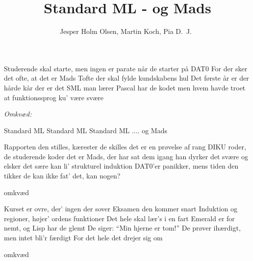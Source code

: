 \documentclass[11pt,a4paper]{article}
\title{Standard ML - og Mads}
\author{Jesper Holm Olsen, Martin Koch, Pia D.\ J.\ }
\begin{document}
\maketitle
\begin{song}
Studerende skal starte, men ingen er parate
når de starter på DAT0
For der sker det ofte, at det er Mads Tofte
der skal fylde kundskabens hul
Det første år er der hårde kår
der er det SML man lærer
Pascal har de kodet
men hvem havde troet
at funktionssprog ku' være svære

\emph{Omkvæd:}

Standard ML
Standard ML
Standard ML
.... og Mads

Rapporten den stilles, kærester de skilles
det er en prøvelse af rang
DIKU roder, de studerende koder
det er Mads, der har sat dem igang
han dyrker det svære og elsker det sære
kan li' strukturel induktion
DAT0'er panikker, mens tiden den tikker
de kan ikke fat' det, kan nogen?

omkvæd

Kurset er ovre, der' ingen der sover
Eksamen den kommer snart
Induktion og regioner, højer' ordens funktioner
Det hele skal lær's i en fart
Emerald er for nemt, og Lisp har de glemt
De siger: ``Min hjerne er tom!''
De prøver ihærdigt, men intet bli'r færdigt
For det hele det drejer sig om

omkvæd

\end{song}
\end{document}
